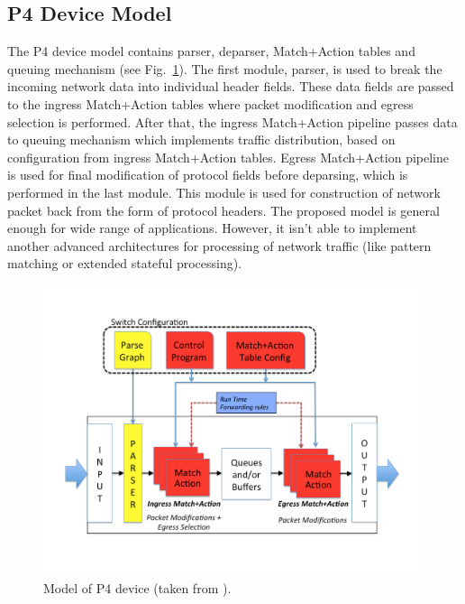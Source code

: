 \subsection{P4 Device Model}
\label{sec:p4Model}
The P4 device model contains parser, deparser, Match+Action tables and queuing mechanism 
(see Fig.~\ref{fig:originalP4DeviceModel}).
The first module, parser, is used to break the incoming network data into individual header fields. These data fields are passed to 
the ingress Match+Action tables where packet modification and egress selection is performed. After that, the ingress Match+Action pipeline passes 
data to queuing mechanism which implements traffic distribution, based on configuration from ingress Match+Action tables. 
Egress Match+Action pipeline is used for final modification of protocol fields before deparsing, which is performed in the last module.
This module is used for construction of network packet back from the form of protocol headers. 
The proposed model is general enough for wide range of applications. 
However, it isn't able to implement another advanced architectures for processing of network traffic 
(like pattern matching or extended stateful processing).  

\begin{figure}[ht]
    \centering
    \includegraphics[width=11cm]{chapters/pic/P4DeviceModel.pdf}
    \caption{Model of P4 device (taken from \protect\cite{p4languagespec}).}
    \label{fig:originalP4DeviceModel}
\end{figure}

